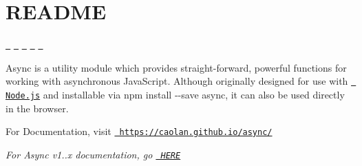 \chapter{README}
\hypertarget{md__c_1_2_users_2_s_t_r_i_d_e_r_2source_2repos_2_internal_a_p_i_2_internal_a_p_i_2wwwroot_2lib_23c33de762b380dee1ff5bed8b34e7853}{}\label{md__c_1_2_users_2_s_t_r_i_d_e_r_2source_2repos_2_internal_a_p_i_2_internal_a_p_i_2wwwroot_2lib_23c33de762b380dee1ff5bed8b34e7853}


\href{https://travis-ci.org/caolan/async}{\texttt{ }} \href{https://www.npmjs.com/package/async}{\texttt{ }} \href{https://coveralls.io/r/caolan/async?branch=master}{\texttt{ }} \href{https://gitter.im/caolan/async?utm_source=badge&utm_medium=badge&utm_campaign=pr-badge&utm_content=badge}{\texttt{ }} \href{https://www.libhive.com/providers/npm/packages/async}{\texttt{ }}

Async is a utility module which provides straight-\/forward, powerful functions for working with asynchronous Java\+Script. Although originally designed for use with \href{https://nodejs.org/}{\texttt{ Node.\+js}} and installable via {\ttfamily npm install -\/-\/save async}, it can also be used directly in the browser.

For Documentation, visit \href{https://caolan.github.io/async/}{\texttt{ https\+://caolan.\+github.\+io/async/}}

{\itshape For Async v1..\+x documentation, go \href{https://github.com/caolan/async/blob/v1.5.2/README.md}{\texttt{ HERE}}} 